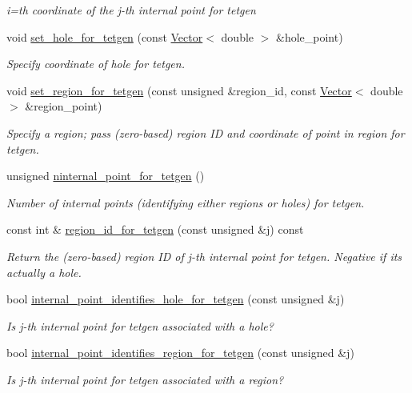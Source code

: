 \begin{DoxyCompactItemize}
\begin{DoxyCompactList}\small\item\em i=th coordinate of the j-\/th internal point for tetgen \end{DoxyCompactList}\item 
void \hyperlink{classoomph_1_1TetMeshFacetedClosedSurface_ae6c1653b9aeef81ae12735e02a1f938d}{set\+\_\+hole\+\_\+for\+\_\+tetgen} (const \hyperlink{classoomph_1_1Vector}{Vector}$<$ double $>$ \&hole\+\_\+point)
\begin{DoxyCompactList}\small\item\em Specify coordinate of hole for tetgen. \end{DoxyCompactList}\item 
void \hyperlink{classoomph_1_1TetMeshFacetedClosedSurface_ac60fa3591df9cdcfc07521410e986130}{set\+\_\+region\+\_\+for\+\_\+tetgen} (const unsigned \&region\+\_\+id, const \hyperlink{classoomph_1_1Vector}{Vector}$<$ double $>$ \&region\+\_\+point)
\begin{DoxyCompactList}\small\item\em Specify a region; pass (zero-\/based) region ID and coordinate of point in region for tetgen. \end{DoxyCompactList}\item 
unsigned \hyperlink{classoomph_1_1TetMeshFacetedClosedSurface_a69fbedd3beddfc55c8bcb7f0e186ec38}{ninternal\+\_\+point\+\_\+for\+\_\+tetgen} ()
\begin{DoxyCompactList}\small\item\em Number of internal points (identifying either regions or holes) for tetgen. \end{DoxyCompactList}\item 
const int \& \hyperlink{classoomph_1_1TetMeshFacetedClosedSurface_a441b6de91c824e29cd10d87bf5264fd7}{region\+\_\+id\+\_\+for\+\_\+tetgen} (const unsigned \&j) const
\begin{DoxyCompactList}\small\item\em Return the (zero-\/based) region ID of j-\/th internal point for tetgen. Negative if it\textquotesingle{}s actually a hole. \end{DoxyCompactList}\item 
bool \hyperlink{classoomph_1_1TetMeshFacetedClosedSurface_aa37311d590909afc7d0ddb867fadfbbf}{internal\+\_\+point\+\_\+identifies\+\_\+hole\+\_\+for\+\_\+tetgen} (const unsigned \&j)
\begin{DoxyCompactList}\small\item\em Is j-\/th internal point for tetgen associated with a hole? \end{DoxyCompactList}\item 
bool \hyperlink{classoomph_1_1TetMeshFacetedClosedSurface_a9152e115fcf854c5974995fd4abc7aa0}{internal\+\_\+point\+\_\+identifies\+\_\+region\+\_\+for\+\_\+tetgen} (const unsigned \&j)
\begin{DoxyCompactList}\small\item\em Is j-\/th internal point for tetgen associated with a region? \end{DoxyCompactList}\end{DoxyCompactItemize}
